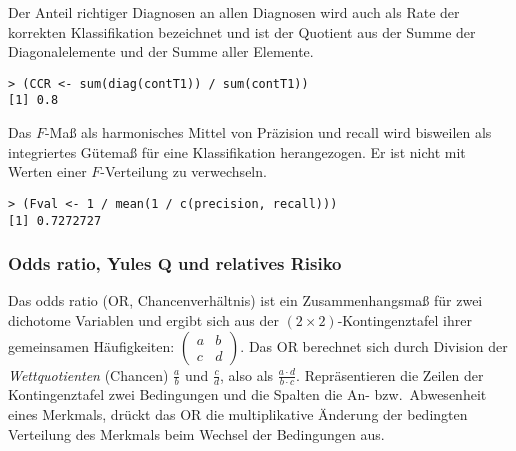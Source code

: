 Der Anteil richtiger Diagnosen an allen Diagnosen wird auch als Rate der korrekten Klassifikation bezeichnet und ist der Quotient aus der Summe der Diagonalelemente und der Summe aller Elemente.
\begin{lstlisting}
> (CCR <- sum(diag(contT1)) / sum(contT1))
[1] 0.8
\end{lstlisting}

Das $F$-Maß als harmonisches Mittel von Präzision und recall wird bisweilen als integriertes Gütemaß für eine Klassifikation herangezogen. Er ist nicht mit Werten einer $F$-Verteilung zu verwechseln.
\begin{lstlisting}
> (Fval <- 1 / mean(1 / c(precision, recall)))
[1] 0.7272727
\end{lstlisting}

\subsubsection{Odds ratio, Yules $\bm{Q}$ und relatives Risiko}

Das odds ratio (OR, Chancenverhältnis) ist ein Zusammenhangsmaß für zwei dichotome Variablen und ergibt sich aus der $(2 \times 2)$-Kontingenztafel ihrer gemeinsamen Häufigkeiten: $\left( \begin{smallmatrix} a & b\\ c & d \end{smallmatrix} \right)$. %
Das OR berechnet sich durch Division der \emph{Wettquotienten} (Chancen) $\frac{a}{b}$ und $\frac{c}{d}$, also als $\frac{a \cdot d}{b \cdot c}$. Repräsentieren die Zeilen der Kontingenztafel zwei Bedingungen und die Spalten die An- bzw.\ Abwesenheit eines Merkmals, drückt das OR die multiplikative Änderung der bedingten Verteilung des Merkmals beim Wechsel der Bedingungen aus.

